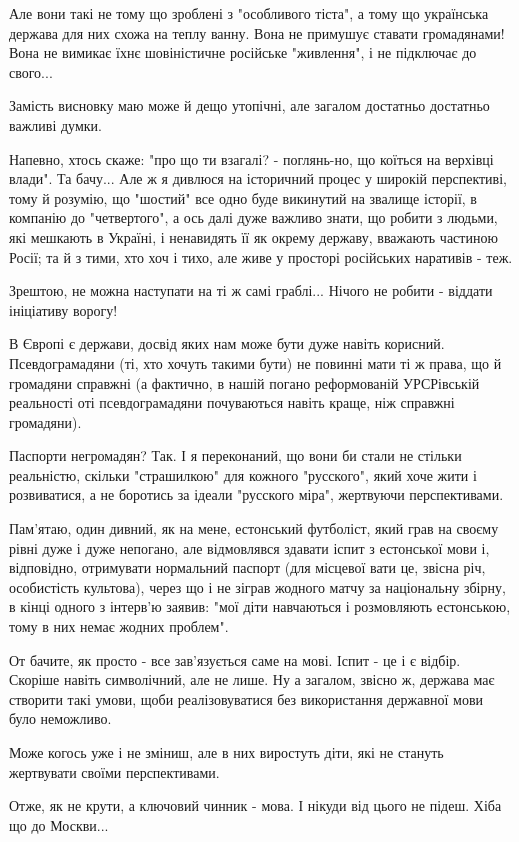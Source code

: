 

Але вони такі не тому що зроблені з "особливого тіста", а тому що українська
держава для них схожа на теплу ванну. Вона не примушує ставати громадянами!
Вона не вимикає їхнє шовіністичне російське "живлення", і не підключає до
свого...

Замість висновку маю може й дещо утопічні, але загалом достатньо достатньо
важливі думки.  

Напевно, хтось скаже: "про що ти взагалі? - поглянь-но, що коїться на верхівці
влади". Та бачу... Але ж я дивлюся на історичний процес у широкій перспективі,
тому й розумію, що "шостий" все одно буде викинутий на звалище історії, в
компанію до "четвертого", а ось далі дуже важливо знати, що робити з людьми,
які мешкають в Україні, і ненавидять її як окрему державу, вважають частиною
Росії; та й з тими, хто хоч і тихо, але живе у просторі російських наративів -
теж.

Зрештою, не можна наступати на ті ж самі граблі... Нічого не робити - віддати
ініціативу ворогу!

В Європі є держави, досвід яких нам може бути дуже навіть корисний.
Псевдограмадяни (ті, хто хочуть такими бути) не повинні мати ті ж права, що й
громадяни справжні (а фактично, в нашій погано реформованій УРСРівській
реальності оті псевдограмадяни почуваються навіть краще, ніж справжні
громадяни).

Паспорти негромадян? Так. І я переконаний, що вони би стали не стільки
реальністю, скільки "страшилкою" для кожного "русского", який хоче жити і
розвиватися, а не боротись за ідеали "русского міра", жертвуючи перспективами.

Пам'ятаю, один дивний, як на мене, естонський футболіст, який грав на своєму
рівні дуже і дуже непогано, але відмовлявся здавати іспит з естонської мови і,
відповідно, отримувати нормальний паспорт (для місцевої вати це, звісна річ,
особистість культова), через що і не зіграв жодного матчу за національну
збірну, в кінці одного з інтерв'ю заявив: "мої діти навчаються і розмовляють
естонською, тому в них немає жодних проблем".

От бачите, як просто - все зав'язується саме на мові. Іспит - це і є відбір.
Скоріше навіть символічний, але не лише. Ну а загалом, звісно ж, держава має
створити такі умови, щоби реалізовуватися без використання державної мови було
неможливо. 

Може когось уже і не зміниш, але в них виростуть діти, які не стануть
жертвувати своїми перспективами. 

Отже, як не крути, а ключовий чинник - мова. І нікуди від цього не підеш. Хіба
що до Москви...

